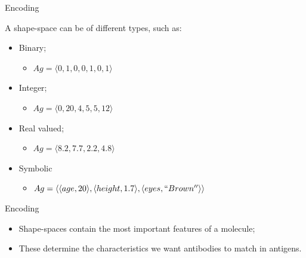 \documentclass[xcolor=svgnames]{beamer}
\begin{document}
        \begin{frame}{Encoding}
            
            \vspace{0.5em}
            
            A shape-space can be of different types, such as:
            
            \vspace{0.5em}
            
            \begin{itemize}
                \item Binary;
                \begin{itemize}
                    \item $Ag = \langle 0,1,0,0,1,0,1 \rangle$
                \end{itemize}
                \vspace{0.3em}
                \item Integer;
                \begin{itemize}
                    \item $Ag = \langle 0, 20, 4, 5, 5, 12 \rangle$
                \end{itemize}
                \vspace{0.3em}                
                \item Real valued;
                \begin{itemize}
                    \item $Ag = \langle 8.2, 7.7, 2.2, 4.8 \rangle$
                \end{itemize}
                \item Symbolic
                \begin{itemize}
                    \item $Ag = \langle \langle age, 20 \rangle, \langle height, 1.7\rangle , \langle eyes,``Brown''\rangle \rangle$
                \end{itemize}
            \end{itemize}
            
        \end{frame}
        
        \begin{frame}{Encoding}
            \begin{itemize}
                \item Shape-spaces contain the most important features of a molecule;
                \vspace{1em}
                \item These determine the characteristics we want antibodies to match in antigens.
            \end{itemize}
        \end{frame}
      
\end{document}
